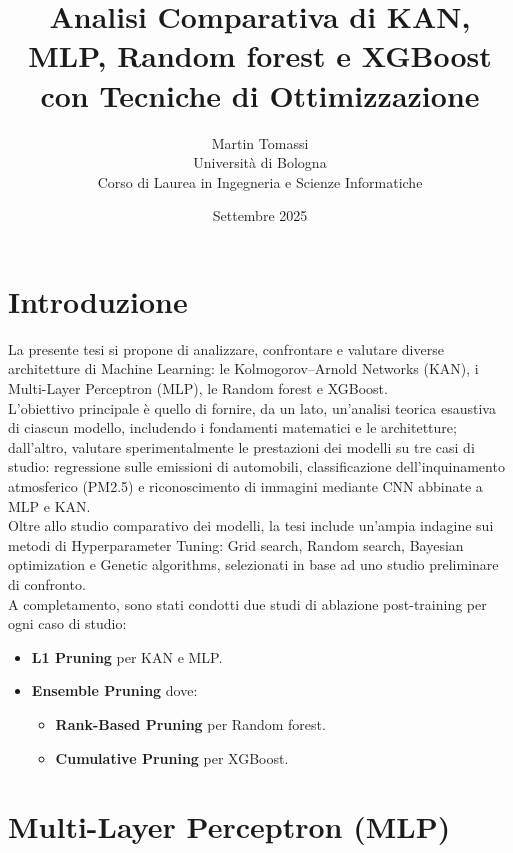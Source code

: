 \documentclass[a4paper,12pt]{report}
\title{Analisi Comparativa di KAN, MLP, Random forest e XGBoost con Tecniche di Ottimizzazione}
\author{Martin Tomassi \\ Università di Bologna \\ Corso di Laurea in Ingegneria e Scienze Informatiche}
\date{Settembre 2025}
\begin{document}
	
	\maketitle
	
	\tableofcontents
	
	\chapter{Introduzione}
	La presente tesi si propone di analizzare, confrontare e valutare diverse architetture di Machine Learning: le Kolmogorov–Arnold Networks (KAN), i Multi-Layer Perceptron (MLP), le Random forest e XGBoost. \\
	L’obiettivo principale è quello di fornire, da un lato, un’analisi teorica esaustiva di ciascun modello, includendo i fondamenti matematici e le architetture; dall’altro, valutare sperimentalmente le prestazioni dei modelli su tre casi di studio: regressione sulle emissioni di automobili, classificazione dell’inquinamento atmosferico (PM2.5) e riconoscimento di immagini mediante CNN abbinate a MLP e KAN. \\
	Oltre allo studio comparativo dei modelli, la tesi include un’ampia indagine sui metodi di Hyperparameter Tuning: Grid search, Random search, Bayesian optimization e Genetic algorithms, selezionati in base ad uno studio preliminare di confronto. \\
	A completamento, sono stati condotti due studi di ablazione post-training per ogni caso di studio:
	\begin{itemize}
		\item \textbf{L1 Pruning} per KAN e MLP.
		\item \textbf{Ensemble Pruning} dove:
		\begin{itemize}
			\item \textbf{Rank-Based Pruning} per Random forest.
			\item \textbf{Cumulative Pruning} per XGBoost.
		\end{itemize}
	\end{itemize}
	
	\chapter{Multi-Layer Perceptron (MLP)}
	
\end{document}
